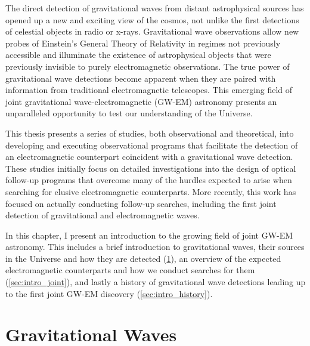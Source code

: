 The direct detection of gravitational waves from distant astrophysical sources has opened up a new and exciting view of the cosmos, not unlike the first detections of celestial objects in radio or x-rays. Gravitational wave observations allow new probes of Einstein's General Theory of Relativity in regimes not previously accessible and illuminate the existence of astrophysical objects that were previously invisible to purely electromagnetic observations. The true power of gravitational wave detections become apparent when they are paired with information from traditional electromagnetic telescopes. This emerging field of joint gravitational wave-electromagnetic (GW-EM) astronomy presents an unparalleled opportunity to test our understanding of the Universe.

This thesis presents a series of studies, both observational and theoretical, into developing and executing observational programs that facilitate the detection of an electromagnetic counterpart coincident with a gravitational wave detection. These studies initially focus on detailed investigations into the design of optical follow-up programs that overcome many of the hurdles expected to arise when searching for elusive electromagnetic counterparts. More recently, this work has focused on actually conducting follow-up searches, including the first joint detection of gravitational and electromagnetic waves.

In this chapter, I present an introduction to the growing field of joint GW-EM astronomy. This includes a brief introduction to gravitational waves, their sources in the Universe and how they are detected (\cref{sec:intro_gw}), an overview of the expected electromagnetic counterparts and how we conduct searches for them (\cref{sec:intro_joint}), and lastly a history of gravitational wave detections leading up to the first joint GW-EM discovery (\cref{sec:intro_history}).

\section{Gravitational Waves}
\label{sec:intro_gw}
